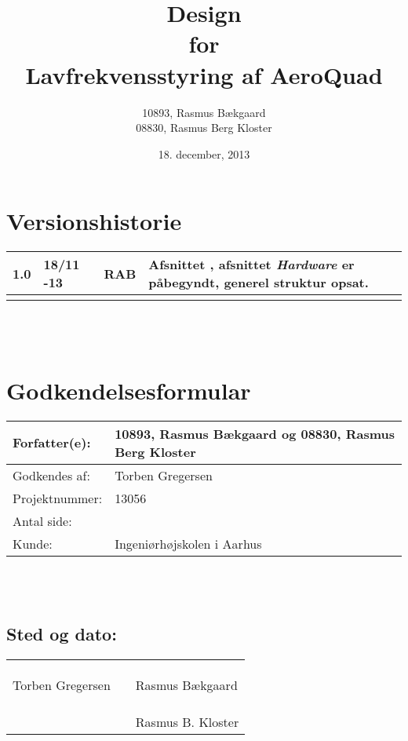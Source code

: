 \documentclass[oneside, 12pt]{memoir}
\title{Design \\ for \\ Lavfrekvensstyring af AeroQuad}
\date{18. december, 2013}
\author{10893, Rasmus Bækgaard\\08830, Rasmus Berg Kloster}
\begin{document}
\begin{titlingpage}
  \maketitle
\end{titlingpage}


\section*{Versionshistorie}
\begin{tabular}{p{}|p{}|p{}|p{}}
1.0 & 18/11 -13 & RAB & Afsnittet \textit{},  afsnittet \textit{Hardware} er påbegyndt, generel struktur opsat.\\ 
\hline 
 & & &  \\ 
\end{tabular} 
\\
\\
\section*{Godkendelsesformular}
\begin{tabular}{p{}|p{}}
\hline 
Forfatter(e): & 10893, Rasmus Bækgaard og 08830, Rasmus Berg Kloster\\ 
\hline 
Godkendes af: & Torben Gregersen \\ 
\hline
Projektnummer: & 13056\\
\hline
Antal side: & \pageref{LastPage} \\
\hline 
Kunde: & Ingeniørhøjskolen i Aarhus \\
\hline
\end{tabular} 
\\
\\
\subsection*{Sted og dato:}
\begin{tabular}{p{} p{} p{}}
&& \\
&& \\
\underline{\qquad \qquad \qquad \qquad \qquad} & \qquad \qquad \qquad & \underline{\qquad \qquad \qquad \qquad \qquad}  \\ 
Torben Gregersen & & Rasmus Bækgaard \\ \\\\
&&  \underline{\qquad \qquad \qquad \qquad \qquad}  \\
& & Rasmus B. Kloster
\end{tabular} 





\newpage
\tableofcontents*
\listoffixmes 





\end{document}

